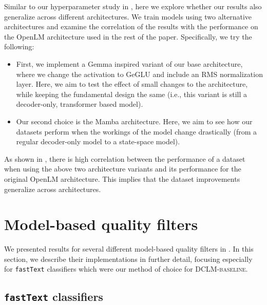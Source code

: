 \documentclass{article}
\newcommand{\hqpool}{\textsc{DCLM-baseline}\xspace}
\newcommand{\fasttext}{\texttt{fastText}\xspace}
\begin{document}
Similar to our hyperparameter study in , here we explore whether our results also generalize across different architectures. We train models using two alternative architectures and examine the correlation of the results with the performance on the OpenLM architecture used in the rest of the paper. Specifically, we try the following:
\begin{itemize}
    \item First, we implement a Gemma \citep{gemmateam2024gemma} inspired variant of our base architecture, where we change the activation to GeGLU and include an RMS normalization layer. Here, we aim to test the effect of small changes to the architecture, while keeping the fundamental design the same (i.e., this variant is still a decoder-only, transformer based model).

    \item Our second choice is the Mamba \citep{mamba} architecture. Here, we aim to see how our datasets perform when the workings of the model change drastically (from a regular decoder-only model to a state-space model).
\end{itemize}

As shown in , there is high correlation between the performance of a dataset when using the above two architecture variants and its performance for the original OpenLM architecture.
This implies that the dataset improvements generalize across architectures.

\section{Model-based quality filters}\label{appx:quality-filters}

We presented results for several different model-based quality filters in . In this section, we describe their implementations in further detail, focusing especially for \fasttext classifiers which were our method of choice for \hqpool.

\subsection{\fasttext classifiers}
\end{document}
